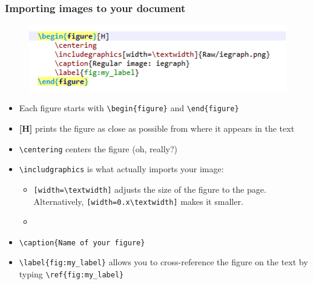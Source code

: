 \documentclass{beamer}
\begin{document}
\begin{frame}[fragile]
	\frametitle{Importing images to your document}
	\begin{figure}
		\includegraphics[width=0.7\linewidth]{import}
	\end{figure}
\begin{itemize}
	\tiny
	\item <1-> Each figure starts with \verb|\begin{figure}| and \verb|\end{figure}|
	\item <2-> \textbf{[H]} prints the figure as close as possible from where it appears in the text
	\item <3-> \verb|\centering| centers the figure (oh, really?)
	\item <4-> \verb|\includgraphics| is what actually imports your image:
	\begin{itemize}
		\tiny
		\item <5-> \verb|[width=\textwidth]| adjusts the size of the figure to the page. Alternatively, \verb|[width=0.x\textwidth]| makes it smaller.
		\item <6-> \color{red}{The path to your figure must begin from the same folder where your .tex file is!}
	\end{itemize}
	\item <7-> \verb|\caption{Name of your figure}|
	\item <8-> \verb|\label{fig:my_label}| allows you to cross-reference the figure on the text by typing \verb|\ref{fig:my_label}|
\end{itemize}
\end{frame}
\end{document}
